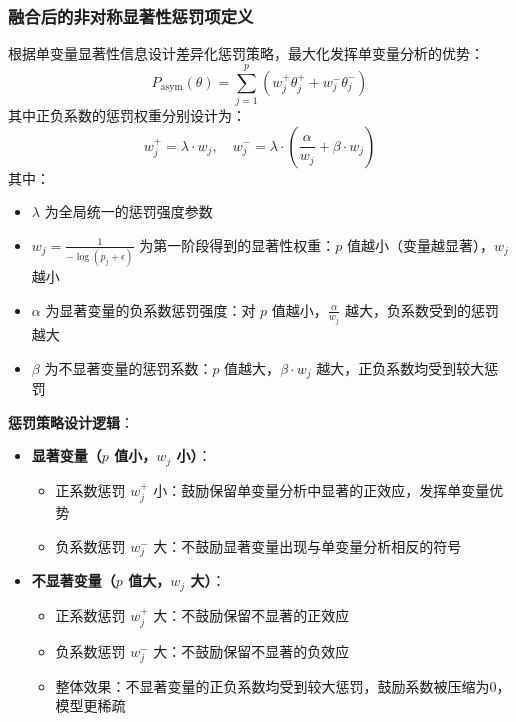 \documentclass[12pt,a4paper]{article}
\begin{document}
\subsubsection{融合后的非对称显著性惩罚项定义}
根据单变量显著性信息设计差异化惩罚策略，最大化发挥单变量分析的优势：
\begin{equation}
    P_{\text{asym}}(\theta) = \sum_{j=1}^p \left( w_j^+ \theta_j^+ + w_j^- \theta_j^- \right)
\end{equation}
其中正负系数的惩罚权重分别设计为：
\begin{equation}
    w_j^+ = \lambda \cdot w_j, \quad w_j^- = \lambda \cdot \left( \frac{\alpha}{w_j} + \beta \cdot w_j \right)
\end{equation}
其中：
\begin{itemize}
    \item $\lambda$ 为全局统一的惩罚强度参数
    \item $w_j = \frac{1}{-\log(p_j + \epsilon)}$ 为第一阶段得到的显著性权重：$p$ 值越小（变量越显著），$w_j$ 越小
    \item $\alpha$ 为显著变量的负系数惩罚强度：对 $p$ 值越小，$\frac{\alpha}{w_j}$ 越大，负系数受到的惩罚越大
    \item $\beta$ 为不显著变量的惩罚系数：$p$ 值越大，$\beta \cdot w_j$ 越大，正负系数均受到较大惩罚
\end{itemize}

\textbf{惩罚策略设计逻辑}：
\begin{itemize}
    \item \textbf{显著变量（$p$ 值小，$w_j$ 小）}：
        \begin{itemize}
            \item 正系数惩罚 $w_j^+$ 小：鼓励保留单变量分析中显著的正效应，发挥单变量优势
            \item 负系数惩罚 $w_j^-$ 大：不鼓励显著变量出现与单变量分析相反的符号
        \end{itemize}
    \item \textbf{不显著变量（$p$ 值大，$w_j$ 大）}：
        \begin{itemize}
            \item 正系数惩罚 $w_j^+$ 大：不鼓励保留不显著的正效应
            \item 负系数惩罚 $w_j^-$ 大：不鼓励保留不显著的负效应
            \item 整体效果：不显著变量的正负系数均受到较大惩罚，鼓励系数被压缩为0，模型更稀疏
        \end{itemize}
\end{itemize}
\end{document}
